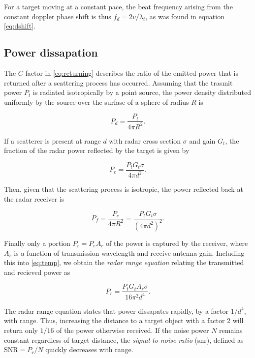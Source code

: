 For a target moving at a constant pace, the beat frequency arising from the constant doppler phase shift is thus $f_d = 2v/\lambda_t$, as was found in equation \ref{eq:dshift}. 


\subsection{Power dissapation}

The $C$ factor in \ref{eq:returning} describes the ratio of the emitted power that is returned after a scattering process has occurred. Assuming that the trasmit power $P_t$ is radiated isotropically by a point source, the power density distributed uniformly by the source over the surfase of a sphere of radius $R$ is \citep{amin_2017}

\begin{equation}
	P_d 
	= \frac{P_t}{4\pi R^2}.
\end{equation}

If a scatterer is present at range $d$ with radar cross section $\sigma$ and gain $G_t$, the fraction of the radar power reflected by the target is given by 

\begin{equation}
	P_{e}
	= \frac{P_tG_t\sigma}{4\pi d^2}.
\end{equation}

Then, given that the scattering process is isotropic, the power reflected back at the radar receiver is

\begin{equation}\label{eq:temp}
	P_f 
	= \frac{P_e}{4\pi R^2} 
	= \frac{P_t G_t \sigma}{(4\pi d^2)^2}.
\end{equation}

Finally only a portion $P_r = P_eA_r$ of the power is captured by the receiver, where $A_r$ is a function of transmission wavelength and receive antenna gain. Including this into \ref{eq:temp}, we obtain the \emph{radar range equation} relating the transmitted and recieved power as

\begin{equation}
	P_r
	= \frac{P_t G_t A_r \sigma}{16\pi^2 d^4}.
\end{equation}

The radar range equation states that power dissapates rapidly, by a factor $1/d^4$, with range. Thus, increasing the distance to a target object with a factor 2 will return only $1/16$ of the power otherwise received. If the noise power $N$ remains constant regardless of target distance, the \emph{signal-to-noise ratio} (\gls{snr}), defined as $\text{SNR} = P_r/N$ quickly decreases with range. 

